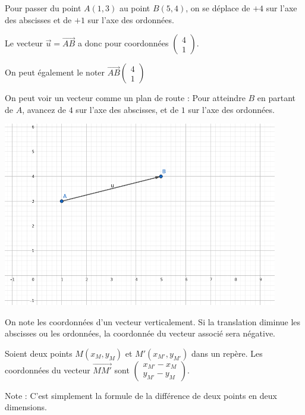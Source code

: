\documentclass[10pt,a4paper,oneside]{book}
\begin{document}
\newcommand*{\Coord}[2]{%
  \ensuremath{ 
    \begin{pmatrix} 
      #1\\ 
      #2 
    \end{pmatrix}}}

\begin{minipage}{0.25\textwidth}
    
Pour passer du point $A(1,3)$ au point $B(5,4)$, on se déplace de $+4$ sur l'axe des abscisses et de $+1$ sur l'axe des ordonnées.

Le vecteur $\overrightarrow{u}=\overrightarrow{AB}$ a donc pour coordonnées $\Coord{4}{1}$.

On peut également le noter $\overrightarrow{AB}\Coord{4}{1}$

On peut voir un vecteur comme un plan de route : Pour atteindre $B$ en partant de $A$, avancez de $4$ sur l'axe des abscisses, et de $1$ sur l'axe des ordonnées.

\end{minipage}
\begin{minipage}{0.7\textwidth}
    \centering
    \includegraphics[width=0.9\textwidth]{vecteurExemple.png} 
\end{minipage}

On note les coordonnées d'un vecteur verticalement. Si la translation diminue les abscisses ou les ordonnées, la coordonnée du vecteur associé sera négative.

\begin{prop}
    Soient deux points $M(x_M,y_M)$ et $M'(x_{M'},y_{M'})$ dans un repère. Les coordonnées du vecteur $\overrightarrow{MM'}$ sont $\Coord{x_{M'}-x_{M}}{y_{M'}-y_{M}}$.
\end{prop}

Note : C'est simplement la formule de la différence de deux points en deux dimensions.
\end{document}
